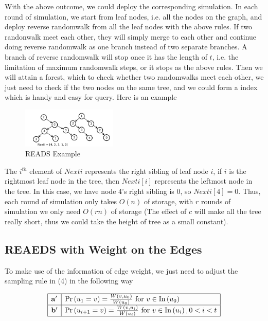 \documentclass[a4paper, 12pt]{article} %
\begin{document}
    With the above outcome, we could deploy the corresponding simulation. In each round of simulation, we start from leaf nodes, i.e. all the nodes on the graph, and deploy reverse randomwalk from all the leaf nodes with the above rules. If two randonwalk meet each other, they will simply merge to each other and continue doing reverse randomwalk as one branch instead of two separate branches. A branch of reverse randomwalk will stop once it has the length of $t$, i.e. the limitation of maximum randomwalk steps, or it stops as the above rules. Then we will attain a forest, which to check whether two randomwalks meet each other, we just need to check if the two nodes on the same tree, and we could form a index which is handy and easy for query. Here is an example
    
    \begin{figure}[H]
        \centering
        \includegraphics[width=0.4\textwidth]{img/READS forest.png}
        \caption{READS Example}
        \label{fig:READS}
    \end{figure}
    
    The $i^{th}$ element of $Nexti$ represents the right sibling of leaf node $i$, if $i$ is the rightmost leaf node in the tree, then $Nexti[i]$ represents the leftmost node in the tree. In this case, we have node 4's right sibling is 0, so $Nexti[4] = 0$. Thus, each round of simulation only takes $O(n)$ of storage, with $r$ rounds of simulation we only need $O(rn)$ of storage (The effect of $c$ will make all the tree really short, thus we could take the height of tree as a small constant).
    
    \subsection{REAEDS with Weight on the Edges}
    
    To make use of the information of edge weight, we just need to adjust the sampling rule in (4) in the following way
    
    \begin{equation}
        \begin{array}{|l|l|}
            \hline \mathbf{a'} & \operatorname{Pr}\left(u_{1}=v\right)=\frac{W(v, u_0)}{W(u_0)} \text { for } v \in \operatorname{In}\left(u_{0}\right) \\
            \hline \mathbf{b'} & \operatorname{Pr}\left(u_{i + 1}=v\right)=\frac{W(v, u_i)}{W(u_i)} \text { for } v \in \operatorname{In}\left(u_{i}\right), 0<i<t \\
        \hline
        \end{array}
    \end{equation}
    
\end{document}
